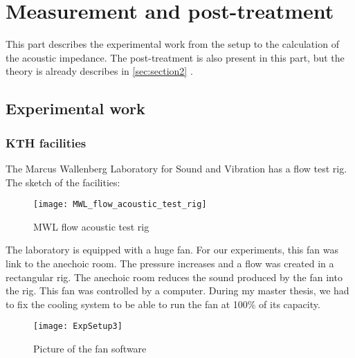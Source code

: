 \section{Measurement and post-treatment}
This part describes the experimental work from the setup to the calculation of the acoustic impedance. The post-treatment is also present in this part, but the theory is already describes in \ref{sec:section2} .
\subsection{Experimental work}
\subsubsection{KTH facilities}
The Marcus Wallenberg Laboratory for Sound and Vibration has a flow test rig. The sketch of the facilities:
\begin{figure}[H] \centering
    \texttt{[image: MWL\_flow\_acoustic\_test\_rig]}
    \caption{MWL flow acoustic test rig}
\end{figure}
The laboratory is equipped with a huge fan. For our experiments, this fan was link to the anechoic room. The pressure increases and a flow was created in a rectangular rig. The anechoic room reduces the sound produced by the fan into the rig. This fan was controlled by a computer. During my master thesis, we had to fix the cooling system to be able to run the fan at 100\% of its capacity. 
\begin{figure}[H] \centering
    \texttt{[image: ExpSetup3]}
    \caption{Picture of the fan software}
\end{figure}\clearpage
